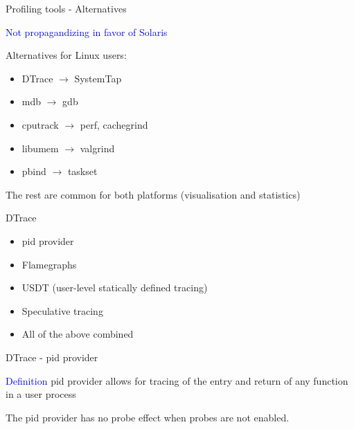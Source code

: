 \documentclass{beamer}
\begin{document}
\begin{frame}{Profiling tools - Alternatives}

\textcolor{blue}{Not propagandizing in favor of Solaris}

\vspace{5mm}

Alternatives for Linux users:

\begin{itemize}
\item DTrace $\rightarrow$ SystemTap
\item mdb $\rightarrow$ gdb
\item cputrack $\rightarrow$ perf, cachegrind
\item libumem $\rightarrow$ valgrind
\item pbind $\rightarrow$ taskset
\end{itemize}

The rest are common for both platforms (visualisation and statistics)

\end{frame}

\begin{frame}{DTrace}

\begin{itemize}
\item pid provider
\item Flamegraphs
\item USDT (user-level statically defined tracing)
\item Speculative tracing
\item All of the above combined
\end{itemize}
\end{frame}

\begin{frame}{DTrace - pid provider}

\textcolor{blue}{Definition} pid provider allows for tracing of the entry and
return of any function in a user process

\vspace{5mm}

The pid provider has no probe effect when probes are not enabled.
\end{frame}

\end{document}

